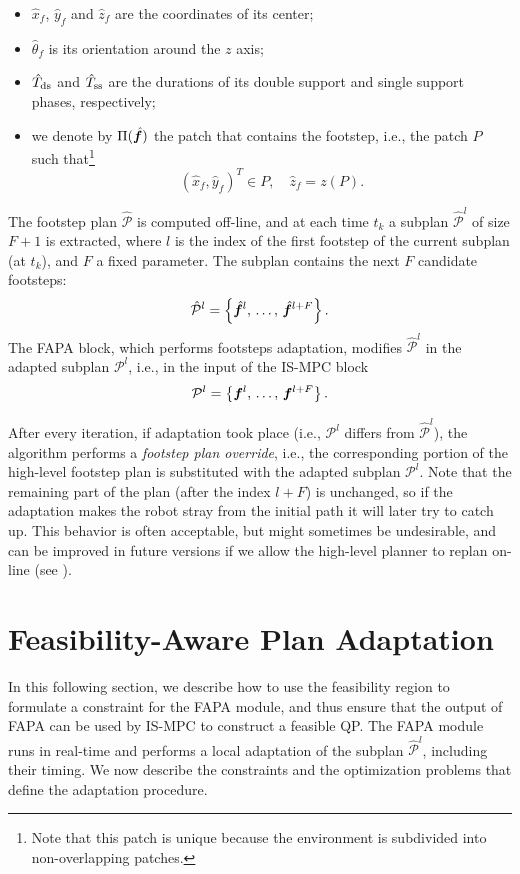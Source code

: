 \begin{itemize}
    \item $\hat x_f$, $\hat y_f$ and $\hat z_f$ are the coordinates of its center;
    \item $\hat\theta_f$ is its orientation around the $z$ axis;
    \item $\hat T_{\rm ds}$ and $\hat T_{\rm ss}$ are the durations of its  double support and single support phases, respectively;
    \item we denote by $\Pi(\hat{{\bm{f}}})$ the patch that contains the footstep, i.e., the patch $P$ such that\footnote{Note that this patch is unique because the environment is subdivided into non-overlapping patches.}
    \[
    (\hat{x}_f, \hat{y}_f)^T \in P,\quad \hat{z}_f = z(P).
    \]
\end{itemize}

The footstep plan $\mathcal{\hat P}$ is computed off-line, and at each time
$t_k$ a subplan $\mathcal{\hat P}^l$ of size $F+1$ is extracted, where $l$ is
the index of the first footstep of the current subplan (at $t_k$), and $F$ a
fixed parameter. The subplan contains the next $F$ candidate footsteps:
\begin{equation*}
\mathcal{\hat P}^l = \left\{
\hat{{\bm{f}}}^{l},\,\dots,\,\hat{{\bm{f}}}^{l+F}
\right\}.
\end{equation*}
The FAPA block, which performs footsteps adaptation, modifies
$\mathcal{\hat P}^l$ in the adapted subplan $\mathcal{P}^l$, i.e., in the input
of the IS-MPC block
\begin{equation*}
    \mathcal{P}^l = \left\{
    {\bm{f}}^{l},\,\dots,\,{\bm{f}}^{l+F}
    \right\}.
\end{equation*}

After every iteration, if adaptation took place (i.e., $\mathcal{P}^l$ differs
from $\mathcal{\hat P}^l$), the algorithm performs a {\em footstep plan
override}, i.e., the corresponding portion of the high-level footstep plan
is substituted with the adapted subplan $\mathcal{P}^l$. Note that the
remaining part of the plan (after the index $l+F$) is unchanged, so if the
adaptation makes the robot stray from the initial path it will later try to
catch up. This behavior is often acceptable, but might sometimes be undesirable,
and can be improved in future versions if we allow the high-level planner
to replan on-line (see \cite{Cipriano2023RAS}).

\section{Feasibility-Aware Plan Adaptation}
\label{sec:FAPA:FeasibilityAwarePlanAdaptation}
In this following
section, we describe how to use the feasibility region to formulate a
constraint for the FAPA module, and thus ensure that the output of FAPA can be
used by IS-MPC to construct a feasible QP.
The FAPA module runs in real-time and performs a local adaptation of the
subplan $\mathcal{\hat P}^l$, including their timing. We now describe the
constraints and the optimization problems that define the adaptation procedure.

